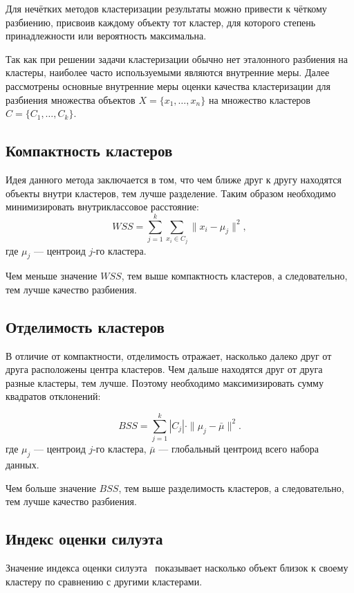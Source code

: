 Для нечётких методов кластеризации результаты можно привести к чёткому разбиению, присвоив каждому объекту тот кластер, для которого степень принадлежности или вероятность максимальна.

Так как при решении задачи кластеризации обычно нет эталонного разбиения на кластеры, наиболее часто используемыми являются внутренние меры. Далее рассмотрены основные внутренние меры оценки качества кластеризации для разбиения множества объектов $X = \{x_1, \dots, x_n\}$ на множество кластеров $C = \{ C_1, \dots, C_k \}$.

\subsection{Компактность кластеров}

Идея данного метода заключается в том, что чем ближе друг к другу находятся объекты внутри кластеров, тем лучше разделение. Таким образом необходимо минимизировать внутриклассовое расстояние:
\begin{equation}
	WSS = \sum_{j=1}^{k}\sum_{x_i \in C_j}\|x_i - \mu_j\|^2,
\end{equation}
где $\mu_j$ --- центроид $j$-го кластера.

Чем меньше значение $WSS$, тем выше компактность кластеров, а следовательно, тем лучше качество разбиения.

\subsection{Отделимость кластеров}
В отличие от компактности, отделимость отражает, насколько далеко друг от друга расположены центра кластеров. Чем дальше находятся друг от друга разные кластеры, тем лучше. Поэтому необходимо максимизировать сумму квадратов отклонений:

\begin{equation}
	BSS = \sum_{j=1}^{k} |C_j| \cdot \|\mu_j - \bar{\mu}\|^2.
\end{equation}
где $\mu_j$ --- центроид $j$-го кластера, $\bar{\mu}$ --- глобальный центроид всего набора данных.

Чем больше значение $BSS$, тем выше разделимость кластеров, а следовательно, тем лучше качество разбиения.

\subsection{Индекс оценки силуэта}
Значение индекса оценки силуэта~\cite{mark_of_clast} показывает насколько объект близок к своему кластеру по сравнению с другими кластерами.

